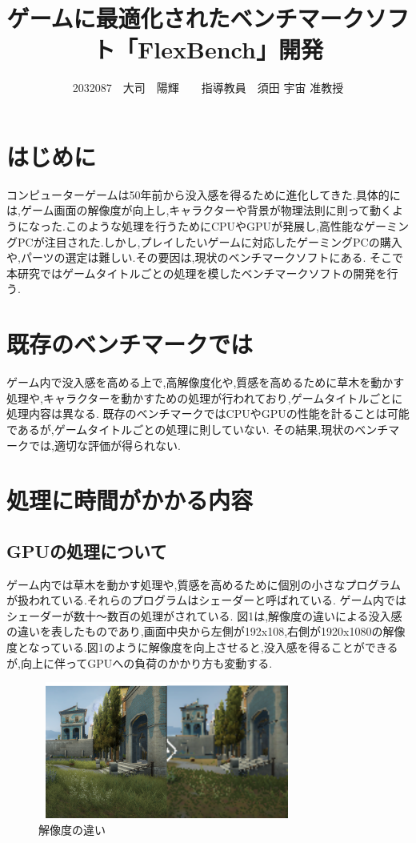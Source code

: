 \documentclass[twocolumn,10pt,a4j]{ltjsarticle}
\title{ゲームに最適化されたベンチマークソフト「FlexBench」開発}
\author{2032087　大司　陽輝　　指導教員　須田 宇宙 准教授}
\date{}
\begin{document}
\maketitle

\section{はじめに}
コンピューターゲームは50年前から没入感を得るために進化してきた.具体的には,ゲーム画面の解像度が向上し,キャラクターや背景が物理法則に則って動くようになった.このような処理を行うためにCPUやGPUが発展し,高性能なゲーミングPCが注目された.しかし,プレイしたいゲームに対応したゲーミングPCの購入や,パーツの選定は難しい.その要因は,現状のベンチマークソフトにある.
そこで本研究ではゲームタイトルごとの処理を模したベンチマークソフトの開発を行う.

\section{既存のベンチマークでは}
ゲーム内で没入感を高める上で,高解像度化や,質感を高めるために草木を動かす処理や,キャラクターを動かすための処理が行われており,ゲームタイトルごとに処理内容は異なる.
既存のベンチマークではCPUやGPUの性能を計ることは可能であるが,ゲームタイトルごとの処理に則していない.
その結果,現状のベンチマークでは,適切な評価が得られない.
 
\section{処理に時間がかかる内容}
 \subsection{GPUの処理について}
ゲーム内では草木を動かす処理や,質感を高めるために個別の小さなプログラムが扱われている.それらのプログラムはシェーダーと呼ばれている.
ゲーム内ではシェーダーが数十〜数百の処理がされている.
図1は,解像度の違いによる没入感の違いを表したものであり,画面中央から左側が192x108,右側が1920x1080の解像度となっている.図1のように解像度を向上させると,没入感を得ることができるが,向上に伴ってGPUへの負荷のかかり方も変動する.
\begin{figure}[h]
\begin{center}
 \includegraphics[clip,width=85mm,height=45mm]{picture_1.png}
  \end{center}
 \caption{解像度の違い}
 \label{fig:教科書}
\end{figure}
\end{document}
